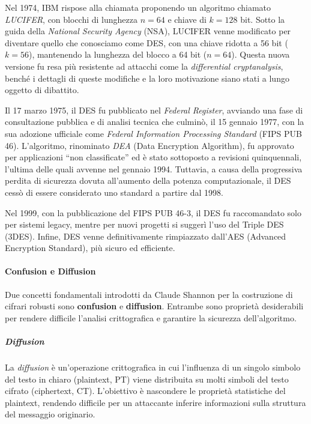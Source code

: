 \documentclass{report}
\begin{document}
Nel 1974, IBM rispose alla chiamata proponendo un algoritmo chiamato \textit{LUCIFER}, con blocchi di lunghezza $n = 64$ e chiave di $k = 128$ bit. Sotto la guida della \textit{National Security Agency} (NSA), LUCIFER venne modificato per diventare quello che conosciamo come DES, con una chiave ridotta a 56 bit ($k = 56$), mantenendo la lunghezza del blocco a 64 bit ($n = 64$). Questa nuova versione fu resa più resistente ad attacchi come la \textit{differential cryptanalysis}, benché i dettagli di queste modifiche e la loro motivazione siano stati a lungo oggetto di dibattito.

Il 17 marzo 1975, il DES fu pubblicato nel \textit{Federal Register}, avviando una fase di consultazione pubblica e di analisi tecnica che culminò, il 15 gennaio 1977, con la sua adozione ufficiale come \textit{Federal Information Processing Standard} (FIPS PUB 46). L’algoritmo, rinominato \textit{DEA} (Data Encryption Algorithm), fu approvato per applicazioni “non classificate” ed è stato sottoposto a revisioni quinquennali, l’ultima delle quali avvenne nel gennaio 1994. Tuttavia, a causa della progressiva perdita di sicurezza dovuta all’aumento della potenza computazionale, il DES cessò di essere considerato uno standard a partire dal 1998.

Nel 1999, con la pubblicazione del FIPS PUB 46-3, il DES fu raccomandato solo per sistemi legacy, mentre per nuovi progetti si suggerì l’uso del Triple DES (3DES). Infine, DES venne definitivamente rimpiazzato dall’AES (Advanced Encryption Standard), più sicuro ed efficiente.

\paragraph{Confusion e Diffusion}

Due concetti fondamentali introdotti da Claude Shannon per la costruzione di cifrari robusti sono \textbf{confusion} e \textbf{diffusion}. Entrambe sono proprietà desiderabili per rendere difficile l’analisi crittografica e garantire la sicurezza dell’algoritmo.

\subparagraph{Diffusion}

La \textit{diffusion} è un’operazione crittografica in cui l’influenza di un singolo simbolo del testo in chiaro (plaintext, PT) viene distribuita su molti simboli del testo cifrato (ciphertext, CT). L’obiettivo è nascondere le proprietà statistiche del plaintext, rendendo difficile per un attaccante inferire informazioni sulla struttura del messaggio originario.
\end{document}
